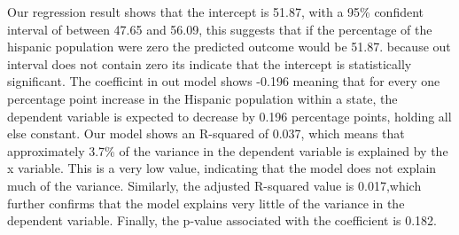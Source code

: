\documentclass[
  letterpaper,
  DIV=11,
  numbers=noendperiod]{scrartcl}
\begin{document}
Our regression result shows that the intercept is 51.87, with a 95\%
confident interval of between 47.65 and 56.09, this suggests that if the
percentage of the hispanic population were zero the predicted outcome
would be 51.87. because out interval does not contain zero its indicate
that the intercept is statistically significant. The coefficint in out
model shows -0.196 meaning that for every one percentage point increase
in the Hispanic population within a state, the dependent variable is
expected to decrease by 0.196 percentage points, holding all else
constant. Our model shows an R-squared of 0.037, which means that
approximately 3.7\% of the variance in the dependent variable is
explained by the x variable. This is a very low value, indicating that
the model does not explain much of the variance. Similarly, the adjusted
R-squared value is 0.017,which further confirms that the model explains
very little of the variance in the dependent variable. Finally, the
p-value associated with the coefficient is 0.182.
\end{document}
